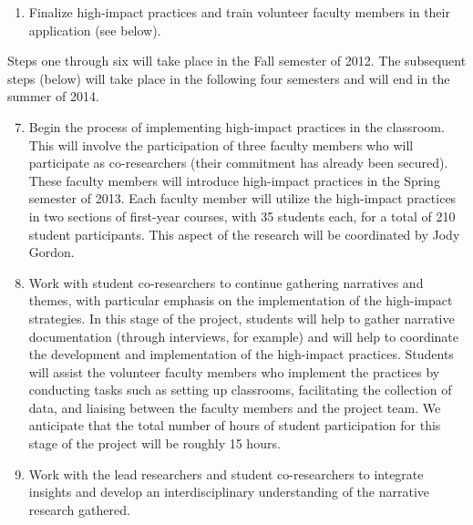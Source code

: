 \documentclass[letterpaper,10pt,headsepline]{scrreprt}
\begin{document}
\begin{enumerate}
\item Finalize high-impact practices and train volunteer faculty members in
  their application (see below).

\end{enumerate}

Steps one through six will take place in the Fall semester of 2012. The
subsequent steps (below) will take place in the following four semesters and
will end in the summer of 2014.

\begin{enumerate}
\setcounter{enumi}{6}
\item Begin the process of implementing high-impact practices in the
  classroom. This will involve the participation of three faculty members who
  will participate as co-researchers (their commitment has already been
  secured). These faculty members will introduce high-impact practices in the
  Spring semester of 2013. Each faculty member will utilize the high-impact
  practices in two sections of first-year courses, with 35 students each, for
  a total of 210 student participants. This aspect of the research will be
  coordinated by Jody Gordon.

\item Work with student co-researchers to continue gathering narratives and
  themes, with particular emphasis on the implementation of the high-impact
  strategies. In this stage of the project, students will help to gather
  narrative documentation (through interviews, for example) and will help to
  coordinate the development and implementation of the high-impact practices.
  Students will assist the volunteer faculty members who implement the
  practices by conducting tasks such as setting up classrooms, facilitating
  the collection of data, and liaising between the faculty members and the
  project team. We anticipate that the total number of hours of student
  participation for this stage of the project will be roughly 15 hours.

\item Work with the lead researchers and student co-researchers to integrate
  insights and develop an interdisciplinary understanding of the narrative
  research gathered.


\end{enumerate}
\end{document}
